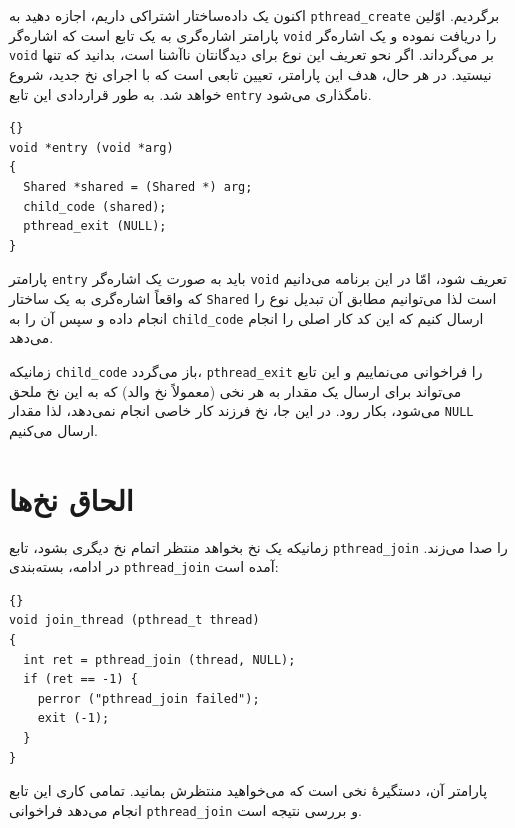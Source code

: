 \documentclass{book}
\begin{document}
    اکنون یک داده‌ساختار اشتراکی داریم، اجازه دهید  به {\tt pthread\_create} برگردیم. 
    اوّلین پارامتر اشاره‌گری به یک تابع است که اشاره‌گر {\tt void} را دریافت نموده و یک اشاره‌گر {\tt void} بر می‌گرداند. 
    اگر نحو تعریف این نوع برای دیدگانتان ناآشنا است، بدانید که تنها نیستید. 
    در هر حال، هدف این پارامتر، تعیین تابعی است که با اجرای نخ جدید، شروع خواهد شد. به طور قراردادی این تابع  {\tt entry} نامگذاری می‌شود. 

\begin{latin}
\begin{lstlisting}[title={}]{}
void *entry (void *arg)
{
  Shared *shared = (Shared *) arg;
  child_code (shared);
  pthread_exit (NULL);
}
\end{lstlisting}
\end{latin}

    پارامتر {\tt entry}  باید به صورت یک اشاره‌گر  {\tt void} تعریف شود،‌ امّا در این برنامه می‌دانیم که واقعاً اشاره‌گری به یک ساختار {\tt Shared}  است 
    لذا می‌توانیم مطابق آن تبدیل نوع را انجام داده و سپس آن را به {\tt child\_code} ارسال کنیم که این کد کار اصلی را انجام می‌دهد. 

    زمانیکه {\tt child\_code} باز می‌گردد، {\tt pthread\_exit} را فراخوانی می‌نماییم 
    و این تابع می‌تواند برای ارسال یک مقدار به هر نخی (معمولاً نخ والد) که به این نخ ملحق می‌شود، بکار رود. 
    در این جا، نخ فرزند کار خاصی انجام نمی‌دهد، لذا مقدار  {\tt NULL} ارسال می‌کنیم. 


\section{الحاق نخ‌ها}


    زمانیکه یک نخ بخواهد منتظر اتمام نخ دیگری بشود، تابع  {\tt pthread\_join} را صدا می‌زند. 
    در ادامه، بسته‌بندی  {\tt pthread\_join} آمده است:‌
    

\begin{latin}
\begin{lstlisting}[title={}]{}
void join_thread (pthread_t thread)
{
  int ret = pthread_join (thread, NULL);
  if (ret == -1) {
    perror ("pthread_join failed");
    exit (-1);
  }
}
\end{lstlisting}
\end{latin}

    پارامتر آن، دستگیرهٔ نخی است که می‌خواهید منتظرش بمانید. تمامی کاری این تابع انجام می‌دهد فراخوانی  {\tt pthread\_join} و بررسی نتیجه است. 
\end{document}
